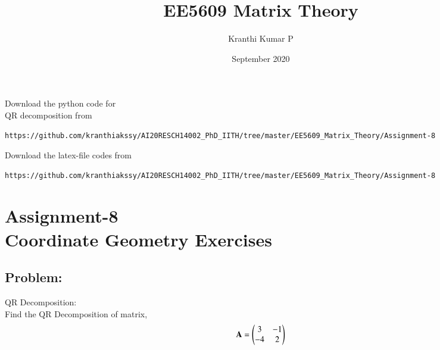 \documentclass[journal,12pt,twocolumn]{IEEEtran}
\begin{document}
     \def\rightbox#1{\makebox[0in][r]{#1}}
     \def\centbox#1{\makebox[0in]{#1}}
     \def\topbox#1{\raisebox{-\baselineskip}[0in][0in]{#1}}
     \def\midbox#1{\raisebox{-0.5\baselineskip}[0in][0in]{#1}}
\vspace{3cm}
\title{EE5609 Matrix Theory}
\author{Kranthi Kumar P}
\date{September 2020}
\maketitle
\newpage
\bigskip
\renewcommand{\thefigure}{\theenumi}
\renewcommand{\thetable}{\theenumi}
Download the python code for \\QR decomposition from 
\begin{lstlisting}
https://github.com/kranthiakssy/AI20RESCH14002_PhD_IITH/tree/master/EE5609_Matrix_Theory/Assignment-8
\end{lstlisting}

Download the latex-file codes from 
%
\begin{lstlisting}
https://github.com/kranthiakssy/AI20RESCH14002_PhD_IITH/tree/master/EE5609_Matrix_Theory/Assignment-8
\end{lstlisting}
\section*{Assignment-8\\Coordinate Geometry Exercises}
\subsection*{Problem:}
QR Decomposition:\\
Find the QR Decomposition of matrix,
\begin{align}
\mathbf{A} = \begin{pmatrix}3&-1\\-4&2\end{pmatrix}
\label{eq:p0}
\end{align}
\end{document}
